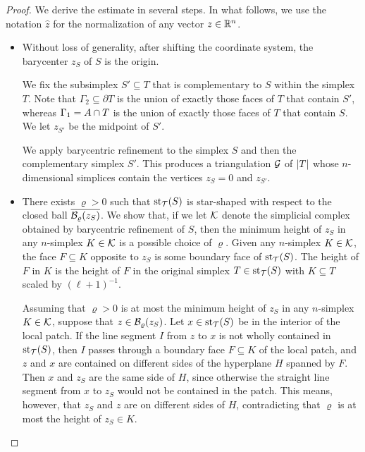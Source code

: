 \documentclass[10pt,a4paper]{article}
\begin{document}
\begin{proof}
    We derive the estimate in several steps. 
    In what follows, we use the notation $\hat z$ for the normalization of any vector $z \in {\mathbb R}^{n}$.
    \begin{itemize}
        \item 
        Without loss of generality, after shifting the coordinate system, the barycenter $z_{S}$ of $S$ is the origin. 
        
        We fix the subsimplex $S' \subseteq T$ that is complementary to $S$ within the simplex $T$.
        Note that ${\Gamma_2} \subseteq \partial T$ is the union of exactly those faces of $T$ that contain $S'$,
        whereas ${\Gamma_1} = A \cap T$ is the union of exactly those faces of $T$ that contain $S$. 
        We let $z_{S'}$ be the midpoint of $S'$. 
        
        We apply barycentric refinement to the simplex $S$ and then the complementary simplex $S'$.
        This produces a triangulation ${\mathcal G}$ of $\left| T \right|$ whose $n$-dimensional simplices contain the vertices $z_{S} = 0$ and $z_{S'}$.
        
        \item 
        There exists $\varrho > 0$ such that $\operatorname{st}_{{\mathcal T}}(S)$ is star-shaped with respect to the closed ball $\overline{{\mathcal B}_{\varrho}(z_S)}$.
        We show that, if we let ${\mathcal K}$ denote the simplicial complex obtained by barycentric refinement of $S$,
        then the minimum height of $z_{S}$ in any $n$-simplex $K \in {\mathcal K}$ is a possible choice of $\varrho$.
        Given any $n$-simplex $K \in {\mathcal K}$, the face $F \subseteq K$ opposite to $z_{S}$ is some boundary face of $\operatorname{st}_{{\mathcal T}}(S)$.
        The height of $F$ in $K$ is the height of $F$ in the original simplex $T \in \operatorname{st}_{{\mathcal T}}(S)$ with $K \subseteq T$ scaled by $(\ell+1)^{-1}$.
        
        Assuming that $\varrho > 0$ is at most the minimum height of $z_{S}$ in any $n$-simplex $K \in {\mathcal K}$,
        suppose that $z \in {\mathcal B}_{\varrho}(z_S)$. 
        Let $x \in \operatorname{st}_{{\mathcal T}}(S)$ be in the interior of the local patch. 
        If the line segment $I$ from $z$ to $x$ is not wholly contained in $\operatorname{st}_{{\mathcal T}}(S)$, 
        then $I$ passes through a boundary face $F \subseteq K$ of the local patch,
        and $z$ and $x$ are contained on different sides of the hyperplane $H$ spanned by $F$. 
        Then $x$ and $z_{S}$ are the same side of $H$, since otherwise the straight line segment from $x$ to $z_{S}$ would not be contained in the patch. 
        This means, however, that $z_{S}$ and $z$ are on different sides of $H$, contradicting that $\varrho$ is at most the height of $z_S \in K$.
        

\end{itemize}
\end{proof}
\end{document}
